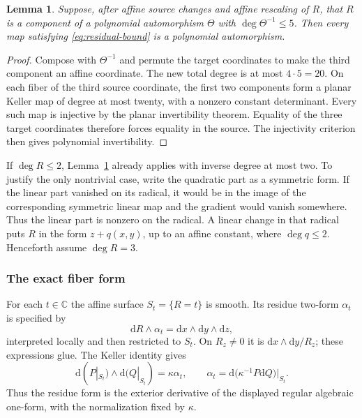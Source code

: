 \documentclass[11pt,reqno]{amsart}
\numberwithin{equation}{section}
\theoremstyle{plain}
\newtheorem{lemma}[theorem]{Lemma}
\theoremstyle{definition}
\theoremstyle{remark}
\newcommand{\C}{\mathbb C}
\newcommand{\dd}{\mathrm d}
\begin{document}
\begin{lemma}\label{lem:completion}
Suppose, after affine source changes and affine rescaling of $R$, that $R$ is a component of a polynomial automorphism $\Theta$ with $\deg\Theta^{-1}\le5$. Then every map satisfying \eqref{eq:residual-bound} is a polynomial automorphism.
\end{lemma}
\begin{proof}
Compose with $\Theta^{-1}$ and permute the target coordinates to make the third component an affine coordinate. The new total degree is at most $4\cdot5=20$. On each fiber of the third source coordinate, the first two components form a planar Keller map of degree at most twenty, with a nonzero constant determinant. Every such map is injective by the planar invertibility theorem. Equality of the three target coordinates therefore forces equality in the source. The injectivity criterion then gives polynomial invertibility.
\end{proof}

If $\deg R\le2$, Lemma~\ref{lem:completion} already applies with inverse degree at most two. To justify the only nontrivial case, write the quadratic part as a symmetric form. If the linear part vanished on its radical, it would be in the image of the corresponding symmetric linear map and the gradient would vanish somewhere. Thus the linear part is nonzero on the radical. A linear change in that radical puts $R$ in the form $z+q(x,y)$, up to an affine constant, where $\deg q\le2$. Henceforth assume $\deg R=3$.

\subsubsection{The exact fiber form}
For each $t\in\C$ the affine surface $S_t=\{R=t\}$ is smooth. Its residue two-form $\alpha_t$ is specified by
\[
\dd R\wedge\alpha_t=\dd x\wedge\dd y\wedge\dd z,
\]
interpreted locally and then restricted to $S_t$. On $R_z\ne0$ it is $\dd x\wedge\dd y/R_z$; these expressions glue. The Keller identity gives
\begin{equation}\label{eq:residue-exact}
\dd(P|_{S_t})\wedge\dd(Q|_{S_t})=\kappa\alpha_t,
\qquad \alpha_t=\dd\bigl(\kappa^{-1}P\dd Q\bigr)|_{S_t}.
\end{equation}
Thus the residue form is the exterior derivative of the displayed regular
algebraic one-form, with the normalization fixed by $\kappa$.
\end{document}

